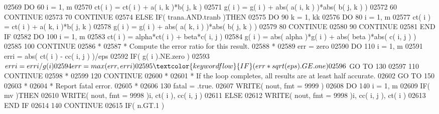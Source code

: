 \begin{DoxyCode}
02569                \textcolor{keywordflow}{DO} 60 i = 1, m
02570                   ct( i ) = ct( i ) + a( i, k )*b( j, k )
02571                   g( i ) = g( i ) + abs( a( i, k ) )*abs( b( j, k ) )
02572    60          \textcolor{keywordflow}{CONTINUE}
02573    70       \textcolor{keywordflow}{CONTINUE}
02574          \textcolor{keywordflow}{ELSE} \textcolor{keywordflow}{IF}( trana.AND.tranb )\textcolor{keywordflow}{THEN}
02575             \textcolor{keywordflow}{DO} 90 k = 1, kk
02576                \textcolor{keywordflow}{DO} 80 i = 1, m
02577                   ct( i ) = ct( i ) + a( k, i )*b( j, k )
02578                   g( i ) = g( i ) + abs( a( k, i ) )*abs( b( j, k ) )
02579    80          \textcolor{keywordflow}{CONTINUE}
02580    90       \textcolor{keywordflow}{CONTINUE}
02581 \textcolor{keywordflow}{         END IF}
02582          \textcolor{keywordflow}{DO} 100 i = 1, m
02583             ct( i ) = alpha*ct( i ) + beta*c( i, j )
02584             g( i ) = abs( alpha )*g( i ) + abs( beta )*abs( c( i, j ) )
02585   100    \textcolor{keywordflow}{CONTINUE}
02586 \textcolor{comment}{*}
02587 \textcolor{comment}{*        Compute the error ratio for this result.}
02588 \textcolor{comment}{*}
02589          err = zero
02590          \textcolor{keywordflow}{DO} 110 i = 1, m
02591             erri = abs( ct( i ) - cc( i, j ) )/eps
02592             \textcolor{keywordflow}{IF}( g( i ).NE.zero )
02593      $         erri = erri/g( i )
02594             err = max( err, erri )
02595             \textcolor{keywordflow}{IF}( err*sqrt( eps ).GE.one )
02596      $         \textcolor{keywordflow}{GO TO} 130
02597   110    \textcolor{keywordflow}{CONTINUE}
02598 \textcolor{comment}{*}
02599   120 \textcolor{keywordflow}{CONTINUE}
02600 \textcolor{comment}{*}
02601 \textcolor{comment}{*     If the loop completes, all results are at least half accurate.}
02602       \textcolor{keywordflow}{GO TO} 150
02603 \textcolor{comment}{*}
02604 \textcolor{comment}{*     Report fatal error.}
02605 \textcolor{comment}{*}
02606   130 fatal = .true.
02607       \textcolor{keyword}{WRITE}( nout, fmt = 9999 )
02608       \textcolor{keywordflow}{DO} 140 i = 1, m
02609          \textcolor{keywordflow}{IF}( mv )\textcolor{keywordflow}{THEN}
02610             \textcolor{keyword}{WRITE}( nout, fmt = 9998 )i, ct( i ), cc( i, j )
02611          \textcolor{keywordflow}{ELSE}
02612             \textcolor{keyword}{WRITE}( nout, fmt = 9998 )i, cc( i, j ), ct( i )
02613 \textcolor{keywordflow}{         END IF}
02614   140 \textcolor{keywordflow}{CONTINUE}
02615       \textcolor{keywordflow}{IF}( n.GT.1 )

\end{DoxyCode}
